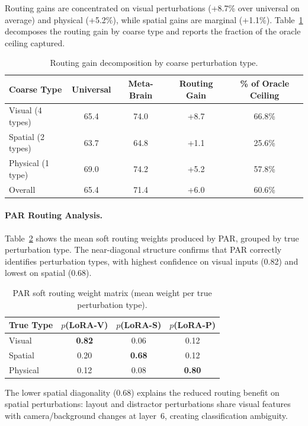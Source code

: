 \documentclass[letterpaper]{article}
\begin{document}
Routing gains are concentrated on visual perturbations (+8.7\% over universal on average) and physical (+5.2\%), while spatial gains are marginal (+1.1\%).
Table~\ref{tab:routing-decomposition} decomposes the routing gain by coarse type and reports the fraction of the oracle ceiling captured.

\begin{table}[h]
\centering
\caption{Routing gain decomposition by coarse perturbation type.}
\label{tab:routing-decomposition}
\small
\begin{tabular}{lcccc}
\toprule
Coarse Type & Universal & Meta-Brain & Routing Gain & \% of Oracle Ceiling \\
\midrule
Visual (4 types)  & 65.4 & 74.0 & +8.7 & 66.8\% \\
Spatial (2 types)  & 63.7 & 64.8 & +1.1 & 25.6\% \\
Physical (1 type) & 69.0 & 74.2 & +5.2 & 57.8\% \\
\midrule
Overall           & 65.4 & 71.4 & +6.0 & 60.6\% \\
\bottomrule
\end{tabular}
\end{table}

\paragraph{PAR Routing Analysis.}
Table~\ref{tab:routing-weights} shows the mean soft routing weights produced by PAR, grouped by true perturbation type.
The near-diagonal structure confirms that PAR correctly identifies perturbation types, with highest confidence on visual inputs (0.82) and lowest on spatial (0.68).

\begin{table}[h]
\centering
\caption{PAR soft routing weight matrix (mean weight per true perturbation type).}
\label{tab:routing-weights}
\small
\begin{tabular}{lccc}
\toprule
True Type & $p$(LoRA-V) & $p$(LoRA-S) & $p$(LoRA-P) \\
\midrule
Visual   & \textbf{0.82} & 0.06 & 0.12 \\
Spatial  & 0.20 & \textbf{0.68} & 0.12 \\
Physical & 0.12 & 0.08 & \textbf{0.80} \\
\bottomrule
\end{tabular}
\end{table}

The lower spatial diagonality (0.68) explains the reduced routing benefit on spatial perturbations: layout and distractor perturbations share visual features with camera/background changes at layer~6, creating classification ambiguity.
\end{document}
